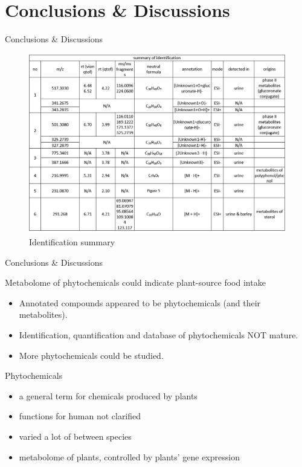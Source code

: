 \documentclass{beamer}
\begin{document}
\section{Conclusions \& Discussions}
\begin{frame}{Conclusions \& Discussions}
\begin{figure}[H]
    \centering
    \includegraphics[scale=0.6]{images/idsummarybarley.PNG}
    \caption{Identification summary}
    \label{fig:idsummary}
\end{figure}
\end{frame}

\begin{frame}{Conclusions \& Discussions}

\begin{block} {Metabolome of phytochemicals could indicate plant-source food intake}
\begin{itemize}
\item Annotated compounds appeared to be phytochemicals (and their metabolites).
\item Identification, quantification and database of phytochemicals NOT mature.
\item More phytochemicals could be studied.
\end{itemize}
\end{block}

\begin{block} {Phytochemicals}
\begin{itemize}
\item a general term for chemicals produced by plants
\item functions for human not clarified
\item varied a lot of between species
\item metabolome of plants, controlled by plants' gene expression
\end{itemize}
\end{block}
\end{frame}
\end{document}
